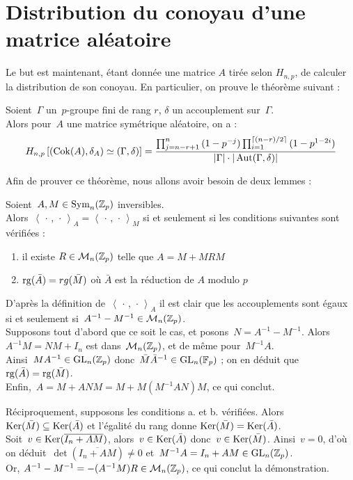 \section{Distribution du conoyau d'une matrice aléatoire}

Le but est maintenant, étant donnée une matrice $A$ tirée selon $H_{n,p}$, de calculer la distribution de son conoyau.
En particulier, on prouve le théorème suivant :

\begin{thm}
Soient~$\Gamma$ un~$p$-groupe fini de rang $r$, $\delta$ un accouplement sur~$\Gamma$.\\
Alors pour~$A$ une matrice symétrique aléatoire, on a :
\[ H_{n,p}\left[(\operatorname{Cok}(A),\delta_A) \simeq (\Gamma,\delta)\right] = \frac{\prod_{j=n-r+1}^{n}{(1-p^{-j})}\prod_{i=1}^{\lceil (n-r)/2\rceil}{(1-p^{1-2i})}}{|\Gamma|\cdot|\operatorname{Aut}(\Gamma,\delta)|}\]
\end{thm} 

Afin de prouver ce théorème, nous allons avoir besoin de deux lemmes :

\begin{lem}
Soient~$A,M\in\operatorname{Sym}_n(\mathbb{Z}_p)$ inversibles.\\ Alors~$\left<\,\cdot\,,\,\cdot\,\right>_{\!A} = \left<\,\cdot\,,\,\cdot\,\right>_{\!M}$ si et seulement si les conditions suivantes sont vérifiées :
\begin{enumerate}
\item il existe $R\in\mathcal M_n(\mathbb{Z}_p)$ telle que $A=M+MRM$
\item $\operatorname{rg}(\bar A) = rg(\bar M)$ où $\bar A$ est la réduction de $A$ modulo $p$
\end{enumerate}
\end{lem}

\begin{dem}
D'après la définition de~$\left<\,\cdot\,,\,\cdot\,\right>_{\!A}$ il est clair que les accouplements sont égaux si et seulement si~$A^{-1} - M^{-1} \in \mathcal{M}_n(\mathbb{Z}_p)$.\\
Supposons tout d'abord que ce soit le cas, et posons~$N = A^{-1} - M^{-1}$. Alors~$A^{-1}M = NM+I_n$ est dans~$\mathcal M_n(\mathbb{Z}_p)$, et de même pour~$M^{-1}A$. \\
Ainsi~$MA^{-1}\in \operatorname{GL}_n(\mathbb{Z}_p)$ donc~$\bar M\bar A^{-1}\in \operatorname{GL}_n(\mathbb F_p)$ ; on en déduit que~$\operatorname{rg}(\bar A) = \operatorname{rg}(\bar M)$.\\
Enfin,~$A = M+ANM = M + M(M^{-1}AN)M$, ce qui conclut.

Réciproquement, supposons les conditions a. et b. vérifiées. Alors~$\operatorname{Ker}(\bar M) \subseteq \operatorname{Ker}(\bar A)$ et l'égalité du rang donne $\operatorname{Ker}(\bar M) = \operatorname{Ker}(\bar A)$.\\
Soit~$v\in\operatorname{Ker}(\overline{I_n+AM})$, alors~$v\in\operatorname{Ker}(\bar A)$ donc~$v\in\operatorname{Ker}(\bar M)$. Ainsi~$v = 0$, d'où on déduit~$\det(\overline{I_n+AM})\neq 0$ et~$M^{-1}A = I_n+AM \in\operatorname{GL}_n(\mathbb{Z}_p)$.\\
Or, $A^{-1}-M^{-1} = -(A^{-1}M)R \in\mathcal M_n(\mathbb{Z}_p)$,  ce qui conclut la démonstration.
\end{dem}

